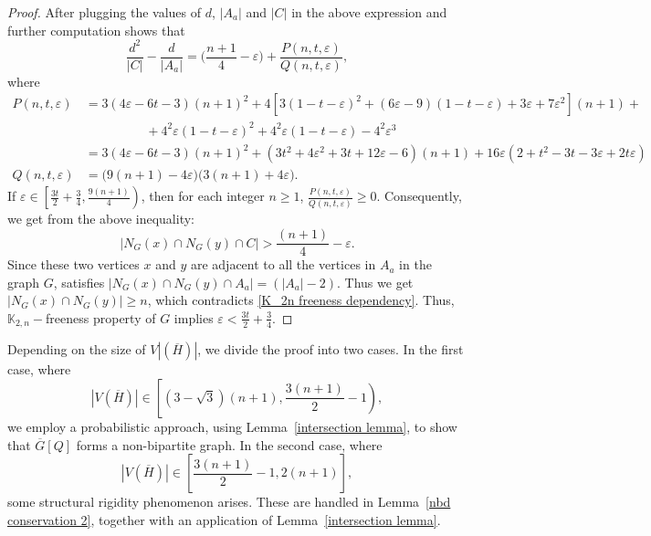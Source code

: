 \documentclass[reqno,10pt]{amsart}
\theoremstyle{definition}
\begin{document}
\begin{proof}
\noindent After plugging the values of $d$, $|A_{a}|$ and $|C|$ in the above expression and further computation shows that 
\begin{equation*}
\frac{d^{2}}{|C|}-\frac{d}{|A_{a}|}= \bigg(\frac{n+1}{4}-\varepsilon\bigg)+\frac{P(n,t,\varepsilon)}{Q(n,t,\varepsilon)},
\end{equation*}
where 
\begin{align*}
 P(n,t,\varepsilon)&=3(4\varepsilon-6t-3)(n+1)^2
+4[3(1-t-\varepsilon)^{2}+(6\varepsilon-9)(1-t-\varepsilon)+3\varepsilon+7\varepsilon^{2}](n+1)+\\
&\hspace{2cm}+4^{2}\varepsilon(1-t-\varepsilon)^{2}+4^{2}\varepsilon(1-t-\varepsilon)-4^{2}\varepsilon^{3}\\
&=3(4\varepsilon-6t-3)(n+1)^2+(3t^{2}+4\varepsilon^{2}+3t+12\varepsilon-6)(n+1)+16\varepsilon(2+t^{2}-3t-3\varepsilon+2t\varepsilon)\\
 Q(n,t,\varepsilon)&=\big(9(n+1)-4\varepsilon\big)\big(3(n+1)+4\varepsilon\big).
\end{align*}
If $\varepsilon\in\left[\frac{3t}{2}+\frac{3}{4},\frac{9(n+1)}{4}\right)$, then for each integer $n\geq1$, $\frac{P(n,t,\varepsilon)}{Q(n,t,\varepsilon)}\geq 0$. Consequently, we get from the above inequality:
\begin{equation*}
 |N_{G}(x)\cap N_{G}(y)\cap C|> \frac{(n+1)}{4}-\varepsilon.   
\end{equation*}
Since these two vertices $x$ and $y$ are adjacent to all the vertices in $A_{a}$ in the graph $G$, satisfies $|N_{G}(x)\cap N_{G}(y)\cap A_{a}|=(|A_{a}|-2)$. Thus we get $|N_{G}(x)\cap N_{G}(y)|\geq n$, which contradicts \eqref{K_2n freeness dependency}. Thus, $\mathbb{K}_{2,n}-$freeness property of $G$ implies $\varepsilon<\frac{3t}{2}+\frac{3}{4}$.
\end{proof}

Depending on the size of $V|(\overline{H})|$, we divide the proof into two cases. In the first case, where
\begin{equation*}
 |V(\overline{H})|\in\left[(3-\sqrt{3})(n+1), \frac{3(n+1)}{2}-1\right),   
\end{equation*}
we employ a probabilistic approach, using Lemma~\ref{intersection lemma}, to show that $\overline{G}[Q]$ forms a non-bipartite graph. In the second case, where 
\begin{equation*}
|V(\overline{H})|\in\left[\frac{3(n+1)}{2}-1, 2(n+1)\right], 
\end{equation*}
some structural rigidity phenomenon arises. These are handled in Lemma~\ref{nbd conservation 2}, together with an application of Lemma~\ref{intersection lemma}.
\end{document}
